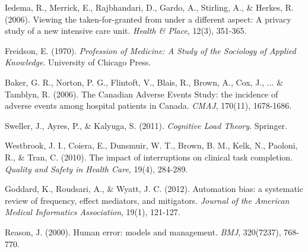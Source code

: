 \documentclass[10pt, twocolumn]{article}
\begin{document}
\begin{thebibliography}{99}
Iedema, R., Merrick, E., Rajbhandari, D., Gardo, A., Stirling, A., \& Herkes, R. (2006). Viewing the taken-for-granted from under a different aspect: A privacy study of a new intensive care unit. \textit{Health \& Place}, 12(3), 351-365.

Freidson, E. (1970). \textit{Profession of Medicine: A Study of the Sociology of Applied Knowledge}. University of Chicago Press.

Baker, G. R., Norton, P. G., Flintoft, V., Blais, R., Brown, A., Cox, J., ... \& Tamblyn, R. (2006). The Canadian Adverse Events Study: the incidence of adverse events among hospital patients in Canada. \textit{CMAJ}, 170(11), 1678-1686.

Sweller, J., Ayres, P., \& Kalyuga, S. (2011). \textit{Cognitive Load Theory}. Springer.

Westbrook, J. I., Coiera, E., Dunsmuir, W. T., Brown, B. M., Kelk, N., Paoloni, R., \& Tran, C. (2010). The impact of interruptions on clinical task completion. \textit{Quality and Safety in Health Care}, 19(4), 284-289.

Goddard, K., Roudsari, A., \& Wyatt, J. C. (2012). Automation bias: a systematic review of frequency, effect mediators, and mitigators. \textit{Journal of the American Medical Informatics Association}, 19(1), 121-127.

Reason, J. (2000). Human error: models and management. \textit{BMJ}, 320(7237), 768-770.

\end{thebibliography}
\end{document}
